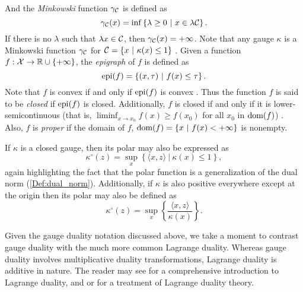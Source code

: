 And the \textit{Minkowski} function $\gamma_{\mathcal C}$ is defined as
\begin{equation}			\label{Def:Minkowski_function}
\gamma_{\mathcal C}(x) = \inf \left\{ \lambda \geq 0 \ | \ x \in \lambda {\mathcal C}  \right\}.
\end{equation}
If there is no $\lambda$ such that $\lambda x \in {\mathcal C}$, then $\gamma_{\mathcal C}(x) = + \infty$.  Note that any gauge $\kappa$ is a Minkowski function $\gamma_{\mathcal C}$ for ${\mathcal C} = \{ x \ | \ \kappa(x) \leq 1 \}$ \cite[Section 15]{rockafellar1970convex}.  Given a function $f : {\mathcal X} \rightarrow {\mathbb R} \cup \{+\infty\}$, the \textit{epigraph} of $f$ is defined as
\begin{equation}		\label{Eqn:epigraph}
\textnormal{epi}(f) = \left\{ (x, \tau) \ | \ f(x) \leq \tau  \right\}.
\end{equation}
Note that $f$ is convex if and only if $\textnormal{epi}(f)$ is convex \cite[Section 7]{rockafellar1970convex}.  Thus the function $f$ is said to be \textit{closed} if $\textnormal{epi}(f)$ is closed.  Additionally, $f$ is closed if and only if it is lower-semicontinuous (that is, $\liminf_{x \rightarrow x_0} f(x) \geq f(x_0)$ for all $x_0$ in $\textnormal{dom}(f)$) \cite[Section 7]{rockafellar1970convex}.  Also, $f$ is \textit{proper} if the domain of $f$, $\textnormal{dom}(f) = \{ x \ | \ f(x) < +\infty \}$ is nonempty.  

If $\kappa$ is a closed gauge, then its polar may also be expressed as \cite[Section 15]{rockafellar1970convex}
\begin{equation}			\label{Def:polar_function_3}
\kappa^\circ(z) = \sup\limits_x \left\{ \langle x, z \rangle \ | \ \kappa(x) \leq 1 \right\},
\end{equation}
again highlighting the fact that the polar function is a generalization of the dual norm (\ref{Def:dual_norm}).  
Additionally, if $\kappa$ is also positive everywhere except at the origin then its polar may also be defined as \cite[Section 15]{rockafellar1970convex}
\begin{equation}			\label{Def:polar_function_4}
\kappa^\circ(z) = \sup\limits_x \left\{ \frac{\langle x, z \rangle}{\kappa(x)} \right\}.
\end{equation}





Given the gauge duality notation discussed above, we take a moment to contrast gauge duality with the much more common Lagrange duality.  Whereas gauge duality involves multiplicative duality transformations, Lagrange duality is additive in nature.  The reader may see \cite[Chapter 5]{boyd2004convex} for a comprehensive introduction to Lagrange duality, and \cite[Section 28]{rockafellar1970convex} or \cite[Chapter 2]{ben2001lectures} for a treatment of Lagrange duality theory.


